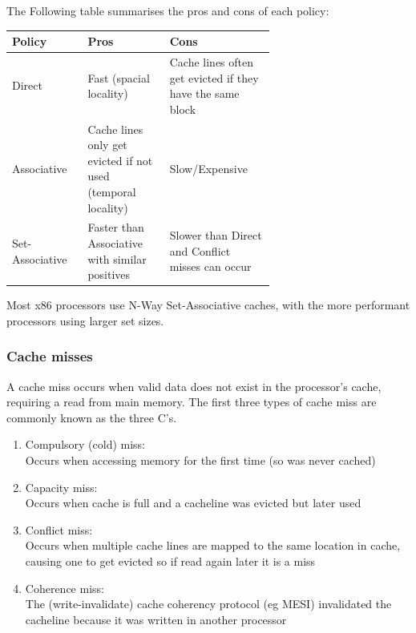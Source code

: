 \documentclass{article}
\newcommand{\layout}[1]{\parbox{\linewidth}{#1}}
\begin{document}
\layout{
  The Following table summarises the pros and cons of each policy:
  \begin{table}[H]
    \centering
    \begin{tabular}{|>{\centering\arraybackslash}m{0.15\linewidth}|m{0.25\linewidth}|m{0.25\linewidth}|}
      \hline \textbf{Policy} & \textbf{Pros} & \textbf{Cons} \\ \hline
      Direct & Fast (spacial locality) & Cache lines often get evicted if they have the same block \\ \hline
      Associative & Cache lines only get evicted if not used (temporal locality) & Slow/Expensive \\ \hline
      Set-Associative & Faster than Associative with similar positives & Slower than Direct and Conflict misses can occur \\ \hline
    \end{tabular}
  \end{table}

  \cite{cache-placement}

  \bigskip

  Most x86 processors use N-Way Set-Associative caches, with the more performant processors using larger set sizes.
}

\layout{
  \subsubsection{Cache misses}

  A cache miss occurs when valid data does not exist in the processor's cache, requiring a read from main memory.
  The first three types of cache miss are commonly known as the three C's.

  \begin{enumerate}
    \item Compulsory (cold) miss: \\
      Occurs when accessing memory for the first time (so was never cached)
    \item Capacity miss: \\
      Occurs when cache is full and a cacheline was evicted but later used
    \item Conflict miss: \\
      Occurs when multiple cache lines are mapped to the same location in cache, causing one to get evicted so if read again later it is a miss
    \item Coherence miss: \\
      The (write-invalidate) cache coherency protocol (eg MESI) invalidated the cacheline because it was written in another processor
  \end{enumerate}

  \cite{cache-miss}
}
\end{document}
